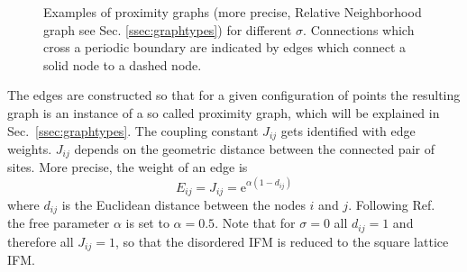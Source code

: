     \begin{figure}[htb]
        \centering
        \caption[Examples of RNG for different $\sigma$]
        {
            Examples of proximity graphs (more precise, Relative Neighborhood
            graph see Sec. \ref{ssec:graphtypes}) for different $\sigma$.
            Connections which cross a periodic boundary are indicated
            by edges which connect a solid node to a dashed node.
        }
        \label{fig:RNG_sigma}
    \end{figure}
    The edges are constructed
    so that for a given configuration of points the resulting graph is an
    instance of a so called proximity graph, which will be explained in Sec.~\ref{ssec:graphtypes}.
    The coupling constant \(J_{ij}\) gets
    identified with edge weights. \(J_{ij}\) depends on the
    geometric distance between the connected pair of sites. More precise,
    the weight of an edge is
    \begin{equation}
        E_{ij} = J_{ij} = \mathrm{e}^{\alpha (1-d_{ij})}
        \label{eq:coupling}
    \end{equation}
    where \(d_{ij}\) is the Euclidean
    distance between the nodes \(i\) and \(j\). Following Ref.~\cite{Lima2000}
    the free parameter \(\alpha\) is set to \(\alpha = 0.5\).
    Note that for \(\sigma = 0\) all \(d_{ij} = 1\) and therefore all
    \(J_{ij} = 1\), so that the disordered IFM is reduced to the
    square lattice IFM.


